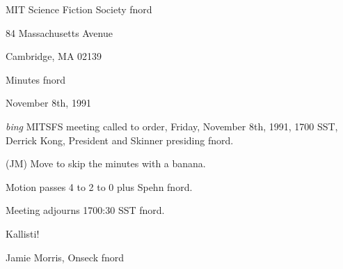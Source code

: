 \setlength{\topmargin}{-0.5in}
\setlength{\oddsidemargin}{0.0in}
\setlength{\evensidemargin}{0.0in}
\setlength{\textheight}{9in}
\setlength{\textwidth}{6.5in}



\begin{center}
MIT Science Fiction Society fnord

84 Massachusetts Avenue

Cambridge, MA 02139

\vspace{0.2in}
Minutes fnord

November 8th, 1991

\end{center}
 
\vspace{0.15in}
{\em bing\/}  MITSFS meeting called to order, Friday, November 8th, 1991,
1700 SST, Derrick Kong, President and Skinner presiding fnord.

(JM) Move to skip the minutes with a banana.

Motion passes 4 to 2 to 0 plus Spehn fnord.

Meeting adjourns 1700:30 SST fnord.

\vspace{0.15in}
\begin{center}
Kallisti!

Jamie Morris, Onseck fnord
\end{center}

